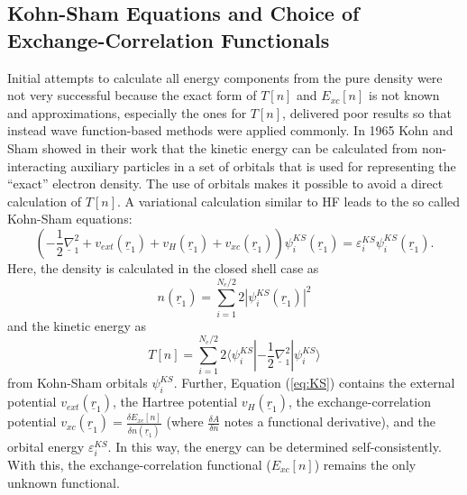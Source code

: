 \documentclass[11pt,DIV=13,BCOR=5mm,a4paper,headinclude]{scrbook}
\renewcommand{\vec}[1]{\underline{#1}}
\begin{document}
\subsection{Kohn-Sham Equations and Choice of Exchange-Correlation Functionals}
Initial attempts to calculate all energy components from the pure density were not very successful because the exact form of $T[n]$ and $E_{xc}[n]$ is not known and approximations, especially the ones for $T[n]$, delivered poor results so that instead wave function-based methods were applied commonly.
In 1965 Kohn and Sham showed in their work\cite{Kohn-Sham1965} that the kinetic energy can be calculated from non-interacting auxiliary particles in a set of orbitals that is used for representing the ``exact'' electron density.
The use of orbitals makes it possible to avoid a direct calculation of $T[n]$\cite{Gross03}. %
A variational calculation similar to HF leads to the so called Kohn-Sham equations:
\begin{equation}\label{eq:KS}
 \left(-\frac{1}{2}\vec{\nabla}^2_1 + v_{ext}(\vec{r}_1) + v_{H}(\vec{r}_1) + v_{xc}(\vec{r}_1) \right)\psi^{KS}_i(\vec{r}_1) = \varepsilon_i^{KS}\psi^{KS}_i(\vec{r}_1).
\end{equation}
Here, the density is calculated in the closed shell case as
\begin{equation}
n(\vec{r}_1)=\sum_{i=1}^{N_e/2}2|\psi_i^{KS}(\vec{r}_1)|^2
\end{equation}
 and the kinetic energy as
 \begin{equation}
 T[n]=\sum_{i=1}^{N_e/2}2\langle\psi_i^{KS}|-\frac{1}{2}\vec{\nabla}_1^2|\psi_i^{KS}\rangle
 \end{equation}
 from Kohn-Sham orbitals $\psi_i^{KS}$.
Further, Equation (\ref{eq:KS}) contains the external potential $v_{ext}(\vec{r}_1)$, the Hartree potential $v_{H}(\vec{r}_1)$, the exchange-correlation potential $v_{xc}(\vec{r}_1)=\frac{\delta E_{xc}[n]}{\delta n(\vec{r}_1)}$ (where $\frac{\delta A}{\delta n}$ notes a functional derivative), and the orbital energy $\varepsilon_i^{KS}$.
In this way, the energy can be determined self-consistently.
With this, the exchange-correlation functional ($E_{xc}[n]$) remains the only unknown functional.
\end{document}
